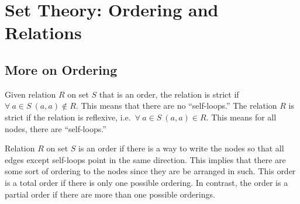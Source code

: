 
\section{Set Theory: Ordering and Relations}

\subsection{More on Ordering}

Given relation \(R\) on set \(S\) that is an order, the relation is strict if \(\forall\:a\in S\:(a,a)\not\in R\). This means that there are no
``self-loops.'' The relation \(R\) is strict if the relation is reflexive, i.e.\ \(\forall\:a\in S\:(a,a)\in R\). This means for all nodes, there
are ``self-loops.'' 

Relation \(R\) on set \(S\) is an order if there is a way to write the nodes so that all edges except self-loops point in the same direction. This
implies that there are some sort of ordering to the nodes since they are be arranged in such. This order is a total order 
if there is only one possible ordering. In contrast, the order is a partial order if there are more than one possible 
orderings. 

